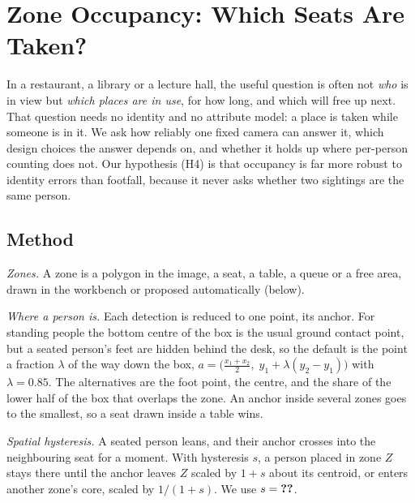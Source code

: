 
\providecommand{\rqfour}[1]{%
  \ifcsname rq4/#1\endcsname\csname rq4/#1\endcsname\else\textbf{??}\fi}

\section{Zone Occupancy: Which Seats Are Taken?}
\label{sec:rq4}
In a restaurant, a library or a lecture hall, the useful question is often not
\emph{who} is in view but \emph{which places are in use}, for how long, and which
will free up next. That question needs no identity and no attribute model: a
place is taken while someone is in it. We ask how reliably one fixed camera
can answer it, which design choices the answer depends on, and whether it holds
up where per-person counting does not. Our hypothesis (H4) is that occupancy is
far more robust to identity errors than footfall, because it never asks whether
two sightings are the same person.

\subsection{Method}
\emph{Zones.} A zone is a polygon in the image, a seat, a table, a queue or a
free area, drawn in the workbench or proposed automatically (below).

\emph{Where a person is.} Each detection is reduced to one point, its anchor.
For standing people the bottom centre of the box is the usual ground contact
point, but a seated person's feet are hidden behind the desk, so the default is
the point a fraction $\lambda$ of the way down the box,
$a = \big(\tfrac{x_1+x_2}{2},\; y_1 + \lambda (y_2-y_1)\big)$ with
$\lambda = 0.85$. The alternatives are the foot point, the centre, and the share
of the lower half of the box that overlaps the zone. An anchor inside several
zones goes to the smallest, so a seat drawn inside a table wins.

\emph{Spatial hysteresis.} A seated person leans, and their anchor crosses into
the neighbouring seat for a moment. With hysteresis $s$, a person placed in zone
$Z$ stays there until the anchor leaves $Z$ scaled by $1+s$ about its centroid,
or enters another zone's core, scaled by $1/(1+s)$. We use $s =
\rqfour{stick}$.

